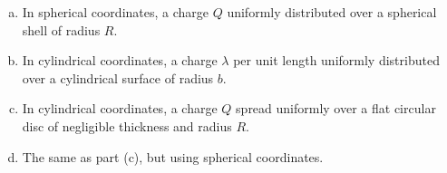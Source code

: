 \begin{enumerate}[(a)]
\item In spherical coordinates, a charge $Q$ uniformly distributed over a spherical shell of radius $R$.

\item In cylindrical coordinates, a charge $\lambda$ per unit length uniformly distributed over a cylindrical
surface of radius $b$.

\item In cylindrical coordinates, a charge $Q$ spread uniformly over a flat circular disc of negligible thickness and radius $R$.

\item The same as part (c), but using spherical coordinates.
\end{enumerate}